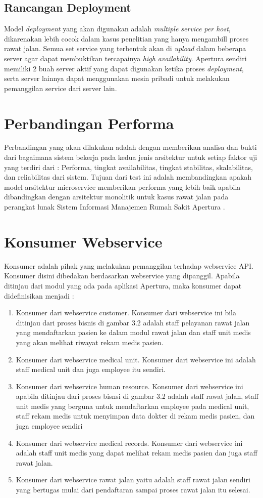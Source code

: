 \subsection{Rancangan Deployment}
Model \textit{deployment} yang akan digunakan adalah \textit{multiple service per host}, dikarenakan lebih cocok dalam kasus penelitian yang hanya mengambill proses rawat jalan. Semua set service yang terbentuk akan di \textit{upload} dalam beberapa server agar dapat membuktikan tercapainya \textit{high availability}. Apertura sendiri memiliki 2 buah server aktif yang dapat digunakan ketika proses \textit{deployment}, serta server lainnya dapat menggunakan mesin pribadi untuk melakukan pemanggilan service dari server lain.
\section{Perbandingan Performa}
Perbandingan yang akan dilakukan adalah dengan memberikan analisa dan bukti dari bagaimana sistem bekerja pada kedua jenis arsitektur untuk setiap faktor uji yang terdiri dari : Performa, tingkat availabilitas, tingkat stabilitas, skalabilitas, dan reliabilitas dari sistem.
Tujuan dari test ini adalah membandingkan apakah model arsitektur microservice memberikan performa yang lebih baik apabila dibandingkan dengan arsitektur monolitik untuk kasus rawat jalan pada perangkat lunak Sistem Informasi Manajemen Rumah Sakit Apertura .

\section{Konsumer Webservice}
Konsumer adalah pihak yang melakukan pemanggilan terhadap webservice
API. Konsumer disini dibedakan berdasarkan webservice yang dipanggil. Apabila
ditinjau dari modul yang ada pada aplikasi Apertura, maka konsumer dapat
didefinisikan menjadi :
\begin{enumerate}[leftmargin=*]
	\item Konsumer dari webservice customer. Konsumer dari webservice ini bila ditinjau dari proses bisnis di gambar 3.2 adalah staff pelayanan rawat jalan	yang mendaftarkan pasien ke dalam modul rawat jalan dan staff unit medis yang akan melihat riwayat rekam medis pasien.

	\item Konsumer dari webservice medical unit. Konsumer dari webservice ini adalah staff medical unit dan juga employee itu sendiri.
	\item Konsumer dari webservice human resource. Konsumer dari webservice ini	apabila ditinjau dari proses bisnsi di gambar 3.2 adalah staff rawat jalan, staff unit medis yang berguna untuk mendaftarkan employee pada medical unit, staff rekam medis untuk menyimpan data dokter di rekam medis pasien, dan juga employee sendiri
	\item Konsumer dari webservice medical records. Konsumer dari webservice ini adalah staff unit medis yang dapat melihat rekam medis pasien dan juga staff rawat jalan.
	\item Konsumer dari webservice rawat jalan yaitu adalah staff rawat jalan sendiri yang bertugas mulai dari pendaftaran sampai proses rawat jalan itu selesai.
\end{enumerate}
\newpage